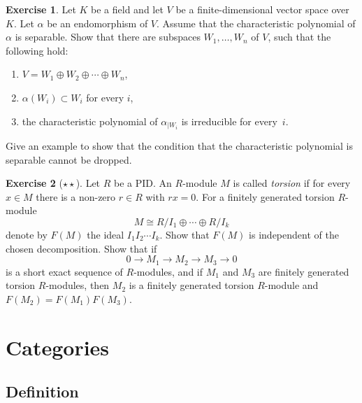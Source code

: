 \documentclass[11pt]{amsbook}
\newcommand{\longto}{\longrightarrow}
\theoremstyle{plain}
\theoremstyle{definition}
\newtheorem{exercise}{Exercise}
\begin{document}
\begin{exercise}
Let $K$ be a field and let $V$ be a finite-dimensional vector space over $K$. Let $\alpha$ be an endomorphism of $V$. Assume that the characteristic polynomial of $\alpha$ is separable. Show that there are subspaces $W_1,\ldots, W_n$ of $V$, such that the following hold:
\begin{enumerate}
\item  $V = W_1 \oplus W_2 \oplus \cdots \oplus W_n$,
\item $\alpha(W_i) \subset W_i$ for every $i$,
\item the characteristic polynomial of $\alpha_{|W_i}$ is irreducible for every~$i$.
\end{enumerate}
Give an example to show that the condition that the characteristic polynomial is separable cannot be dropped.
\end{exercise}


\begin{exercise}[$\star\star$]
Let $R$ be a PID. An $R$-module $M$ is called \emph{torsion} if for every $x\in M$ there is a non-zero $r\in R$ with $rx=0$. 
For a finitely generated torsion $R$-module
\[
	M\cong R/I_1 \oplus \cdots \oplus R/I_k
\]
denote by $F(M)$ the ideal $I_1I_2\cdots I_k$. Show that $F(M)$ is independent of the chosen decomposition. Show that if 
\[
	0 \longto M_1 \longto M_2 \longto M_3 \longto 0
\]
is a short exact sequence of $R$-modules, and if $M_1$ and $M_3$ are finitely generated torsion $R$-modules, then $M_2$ is a finitely generated torsion $R$-module and $F(M_2)=F(M_1)F(M_3)$.
\end{exercise}



\chapter{Categories}
\label{chapter:categories}


\section{Definition}
\end{document}

